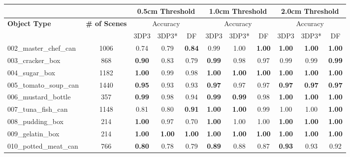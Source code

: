\begin{table}[]
	\fontsize{6.5pt}{6.5pt}\selectfont
	\setlength{\tabcolsep}{3pt}
	\centering
	\centering
	\begin{tabular}{@{}lc|ccc|ccc|ccc@{}}
		\toprule
		\multicolumn{1}{l}{} &
		&
		\multicolumn{3}{c}{\textbf{0.5cm Threshold}} &
		\multicolumn{3}{c}{\textbf{1.0cm Threshold}} &
		\multicolumn{3}{c}{\textbf{2.0cm Threshold}} \\ \midrule
		\multirow{2}{*}{\textbf{Object Type}} &
		\multirow{2}{*}{\textbf{\# of Scenes}} &
		\multicolumn{3}{c}{Accuracy} &
		\multicolumn{3}{c}{Accuracy} &
		\multicolumn{3}{c}{Accuracy}
		\\
		&
		&
		\multicolumn{1}{c}{3DP3} &
		\multicolumn{1}{c}{3DP3*} &
		\multicolumn{1}{c}{DF} &
		\multicolumn{1}{c}{3DP3} &
		\multicolumn{1}{c}{3DP3*} &
		\multicolumn{1}{c}{DF} &
		\multicolumn{1}{c}{3DP3} &
		\multicolumn{1}{c}{3DP3*} &
		\multicolumn{1}{c}{DF} 
		\\ \midrule
		002\_master\_chef\_can & 1006 &0.74  & 0.79  & \textbf{0.84}  & 0.99  & 1.00  & \textbf{1.00}  & \textbf{1.00}  & \textbf{1.00}  & \textbf{1.00} \\  
		003\_cracker\_box & 868 &\textbf{0.90}  & 0.83  & 0.79  & \textbf{0.99}  & 0.98  & 0.97  & 0.99  & 0.99  & \textbf{0.99} \\  
		004\_sugar\_box & 1182 &\textbf{1.00}  & 0.99  & 0.98  & \textbf{1.00}  & \textbf{1.00}  & \textbf{1.00}  & \textbf{1.00}  & \textbf{1.00}  & \textbf{1.00} \\  
		005\_tomato\_soup\_can & 1440 &\textbf{0.95}  & 0.93  & 0.93  & \textbf{0.97}  & 0.97  & 0.97  & \textbf{0.97}  & \textbf{0.97}  & \textbf{0.97} \\  
		006\_mustard\_bottle & 357 &\textbf{0.99}  & 0.98  & 0.94  & \textbf{0.99}  & \textbf{0.99}  & 0.98  & \textbf{1.00}  & \textbf{1.00}  & \textbf{1.00} \\  
		007\_tuna\_fish\_can & 1148 &0.81  & 0.80  & \textbf{0.91}  & \textbf{1.00}  & \textbf{1.00}  & 0.99  & 1.00  & 1.00  & \textbf{1.00} \\  
		008\_pudding\_box & 214 &\textbf{1.00}  & 0.97  & 0.70  & \textbf{1.00}  & 1.00  & 1.00  & \textbf{1.00}  & \textbf{1.00}  & \textbf{1.00} \\  
		009\_gelatin\_box & 214 &\textbf{1.00}  & \textbf{1.00}  & \textbf{1.00}  & \textbf{1.00}  & \textbf{1.00}  & \textbf{1.00}  & \textbf{1.00}  & \textbf{1.00}  & \textbf{1.00} \\  
		010\_potted\_meat\_can & 766 &\textbf{0.80}  & 0.78  & 0.79  & \textbf{0.89}  & 0.88  & 0.87  & \textbf{0.93}  & 0.93  & 0.92 \\  

\end{tabular}
\end{table}
